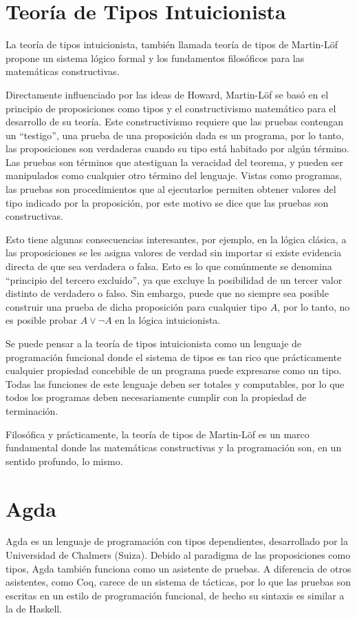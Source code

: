 \section{Teoría de Tipos Intuicionista}
La teoría de tipos intuicionista, también llamada teoría de tipos de Martin-Löf \cite{ITT} propone un sistema lógico formal y los fundamentos filosóficos para las matemáticas constructivas.

Directamente influenciado por las ideas de Howard, Martin-Löf se basó en el principio de proposiciones como tipos y el constructivismo matemático para el desarrollo de su teoría.
Este constructivismo requiere que las pruebas contengan un ``testigo'', una prueba de una proposición dada es un programa, por lo tanto, las proposiciones son verdaderas cuando su tipo está habitado por algún término.
Las pruebas son términos que atestiguan la veracidad del teorema, y pueden ser manipulados como cualquier otro término del lenguaje.
Vistas como programas, las pruebas son procedimientos que al ejecutarlos permiten obtener valores del tipo indicado por la proposición, por este motivo se dice que las pruebas son constructivas.

Esto tiene algunas consecuencias interesantes, por ejemplo, en la lógica clásica, a las proposiciones se les asigna valores de verdad sin importar si existe evidencia directa de que sea verdadera o falsa.
Esto es lo que comúnmente se denomina ``principio del tercero excluido'', ya que excluye la posibilidad de un tercer valor distinto de verdadero o falso.
Sin embargo, puede que no siempre sea posible construir una prueba de dicha proposición para cualquier tipo $A$, por lo tanto, no es posible probar $A \vee \neg A$ en la lógica intuicionista.


Se puede pensar a la teoría de tipos intuicionista como un lenguaje de programación funcional donde el sistema de tipos es tan rico que prácticamente cualquier propiedad concebible de un programa puede expresarse como un tipo.
Todas las funciones de este lenguaje deben ser totales y computables, por lo que todos los programas deben necesariamente cumplir con la propiedad de terminación.

Filosófica y prácticamente, la teoría de tipos de Martin-Löf es un marco fundamental donde las matemáticas constructivas y la programación son, en un sentido profundo, lo mismo.


\section{Agda}
Agda es un lenguaje de programación con tipos dependientes, desarrollado por la Universidad de
Chalmers (Suiza).
Debido al paradigma de las proposiciones como tipos, Agda también funciona como un asistente de pruebas.
A diferencia de otros asistentes, como Coq, carece de un sistema de tácticas, por lo que las pruebas son escritas en un estilo de programación funcional, de hecho su sintaxis es similar a la de Haskell.

